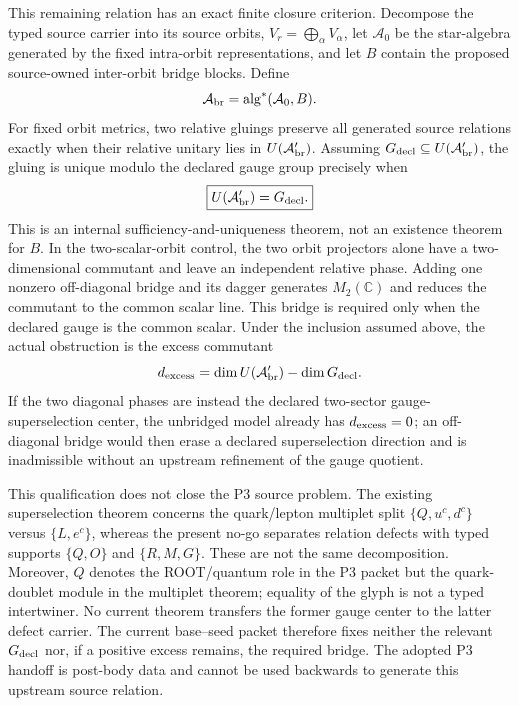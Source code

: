 \documentclass[11pt]{article}
\begin{document}
This remaining relation has an exact finite closure criterion.  Decompose the
typed source carrier into its source orbits,
$V_r=\bigoplus_\alpha V_\alpha$, let $\mathcal A_0$ be the star-algebra
generated by the fixed intra-orbit representations, and let $B$ contain the
proposed source-owned inter-orbit bridge blocks.  Define
\begin{equation}
\mathcal A_{\rm br}=\operatorname{alg}^*(\mathcal A_0,B).
\label{eq:bridgealgebra}
\end{equation}
For fixed orbit metrics, two relative gluings preserve all generated source
relations exactly when their relative unitary lies in
$U(\mathcal A_{\rm br}')$.  Assuming
$G_{\rm decl}\subseteq U(\mathcal A_{\rm br}')$, the gluing is unique modulo
the declared gauge group precisely when
\begin{equation}
\boxed{U(\mathcal A_{\rm br}')=G_{\rm decl}.}
\label{eq:bridgecommutant}
\end{equation}
This is an internal sufficiency-and-uniqueness theorem, not an existence
theorem for $B$.  In the two-scalar-orbit control, the two orbit projectors
alone have a two-dimensional commutant and leave an independent relative
phase.  Adding one nonzero off-diagonal bridge and its dagger generates
$M_2(\mathbb C)$ and reduces the commutant to the common scalar line.  This
bridge is required only when the declared gauge is the common scalar.  Under
the inclusion assumed above, the actual obstruction is the excess commutant
\begin{equation}
d_{\rm excess}=\dim U(\mathcal A_{\rm br}')-\dim G_{\rm decl}.
\label{eq:bridgeexcess}
\end{equation}
If the two diagonal phases are instead the declared two-sector
gauge-superselection center, the unbridged model already has
$d_{\rm excess}=0$; an off-diagonal bridge would then erase a declared
superselection direction and is inadmissible without an upstream refinement
of the gauge quotient.

This qualification does not close the P3 source problem.  The existing
superselection theorem concerns the quark/lepton multiplet split
$\{Q,u^c,d^c\}$ versus $\{L,e^c\}$, whereas the present no-go separates
relation defects with typed supports $\{Q,O\}$ and $\{R,M,G\}$.  These are not
the same decomposition.  Moreover, $Q$ denotes the ROOT/quantum role in the
P3 packet but the quark-doublet module in the multiplet theorem; equality of
the glyph is not a typed intertwiner.  No current theorem transfers the former
gauge center to the latter defect carrier.  The current base--seed packet therefore
fixes neither the relevant $G_{\rm decl}$ nor, if a positive excess remains,
the required bridge.  The adopted P3 handoff is post-body data and cannot be
used backwards to generate this upstream source relation.
\end{document}
